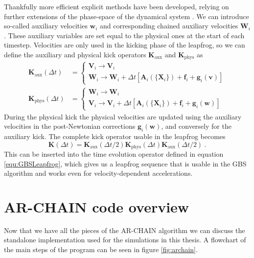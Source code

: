 \documentclass[english, oneside]{HYgradu}
\begin{document}
Thankfully more efficient explicit methods have been developed, relying on further extensions of the phase-space of the dynamical system \citep{hellstrom:2010, pihajoki:2015}. We can introduce so-called auxiliary velocities $\mathbf{w}_i$ and corresponding chained auxiliary velocities $\mathbf{W}_i$. These auxiliary variables are set equal to the physical ones at the start of each timestep. Velocities are only used in the kicking phase of the leapfrog, so we can define the auxiliary and physical kick operators $\mathbf{K}_{\mathrm{aux}}$ and $\mathbf{K}_{\mathrm{phys}}$ as
\begin{align}
\mathbf{K}_{\mathrm{aux}}(\Delta t) &=
\begin{cases}
\mathbf{V}_i \rightarrow \mathbf{V}_i \\
\mathbf{W}_i \rightarrow \mathbf{W}_i + \Delta t [ \boldsymbol{A}_i(\{ \boldsymbol{X}_i \}) + \boldsymbol{f}_i + \boldsymbol{g}_i(\mathbf{v})]
\end{cases} \\
\mathbf{K}_{\mathrm{phys}}(\Delta t) &=
\begin{cases}
\mathbf{W}_i \rightarrow \mathbf{W}_i \\
\mathbf{V}_i \rightarrow \mathbf{V}_i + \Delta t [ \boldsymbol{A}_i(\{ \boldsymbol{X}_i \}) + \boldsymbol{f}_i + \boldsymbol{g}_i(\mathbf{w})]
\end{cases}
\end{align}
During the physical kick the physical velocities are updated using the auxiliary velocities in the post-Newtonian corrections $\boldsymbol{g}_i(\mathbf{w})$, and conversely for the auxiliary kick. The complete kick operator usable in the leapfrog becomes
\begin{equation}
\mathbf{K}(\Delta t) = \mathbf{K}_{\mathrm{aux}}(\Delta t/2) \mathbf{K}_{\mathrm{phys}}(\Delta t) \mathbf{K}_{\mathrm{aux}}(\Delta t/2) \ .
\end{equation}
This can be inserted into the time evolution operator defined in equation \ref{equ:GBSLeapfrog}, which gives us a leapfrog sequence that is usable in the GBS algorithm and works even for velocity-dependent accelerations.

\section{AR-CHAIN code overview}

Now that we have all the pieces of the AR-CHAIN algorithm we can discuss the standalone implementation used for the simulations in this thesis. A flowchart of the main steps of the program can be seen in figure \ref{fig:archain}.
\end{document}
